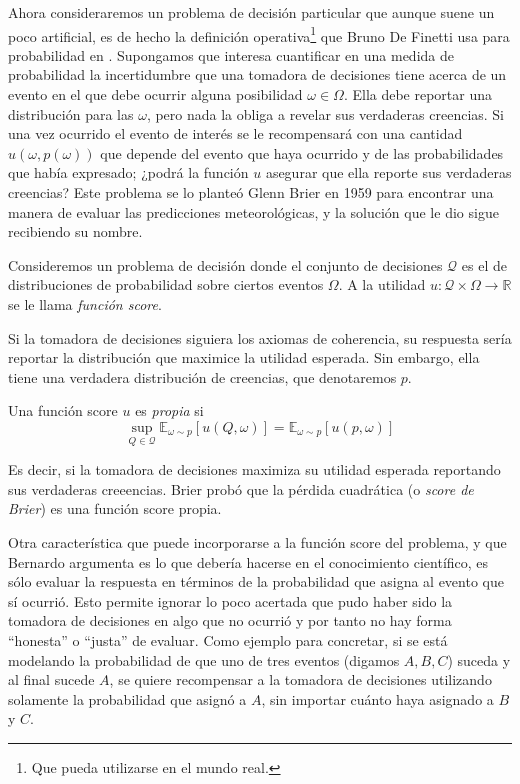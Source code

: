 \documentclass[main.tex]{subfiles}
\begin{document}
Ahora consideraremos un problema de decisión particular que aunque suene un poco
artificial, es de hecho la definición operativa\footnote{Que pueda utilizarse en
el mundo real.} que Bruno De Finetti usa para probabilidad en
\cite{definetti2008}.  Supongamos que interesa cuantificar en una medida de
probabilidad la incertidumbre que una tomadora de decisiones tiene acerca de un
evento en el que debe ocurrir alguna posibilidad  $\omega \in \Omega$. Ella debe
reportar una distribución para las $\omega$, pero nada la obliga a revelar sus
verdaderas creencias. Si una vez ocurrido el evento de interés se le
recompensará con una cantidad $u(\omega,p(\omega))$ que depende del evento que
haya ocurrido y de las probabilidades que había expresado; ¿podrá la función $u$
asegurar que ella reporte sus verdaderas creencias?  Este problema se lo planteó
Glenn Brier en 1959 para encontrar una manera de evaluar las predicciones
meteorológicas, y la solución que le dio sigue recibiendo su nombre. 

\begin{definition}
	Consideremos un problema de decisión donde el conjunto de decisiones
	$\mathcal{Q}$ es el de distribuciones de probabilidad sobre ciertos eventos
	$\Omega$. A la utilidad $u: \mathcal{Q}\times\Omega \to \mathbb{R}$ se le
	llama \textit{función score}.
\end{definition}

Si la tomadora de decisiones siguiera los axiomas de coherencia, su respuesta
sería reportar la distribución que maximice la utilidad esperada. Sin embargo,
ella tiene una verdadera distribución de creencias, que denotaremos $p$. 

\begin{definition}
	Una función score $u$ es \textit{propia} si
	\begin{equation*}
		\sup_{Q \in \mathcal{Q}} 
		\mathbb{E}_{\omega\sim p}\left[u(Q,\omega)\right] = 
		\mathbb{E}_{\omega\sim p}\left[u(p,\omega)\right]
	\end{equation*}
\end{definition}

Es decir, si la tomadora de decisiones maximiza su utilidad esperada reportando
sus verdaderas creeencias. Brier probó que la pérdida cuadrática (o
\textit{score de Brier}) es una función score propia.

Otra característica que puede incorporarse a la función score del problema, y
que Bernardo argumenta es lo que debería hacerse en el conocimiento científico,
es sólo evaluar la respuesta en términos de la probabilidad que asigna al evento
que sí ocurrió. Esto permite ignorar lo poco acertada que pudo haber sido la
tomadora de decisiones en algo que no ocurrió y por tanto no hay forma
\enquote{honesta} o \enquote{justa} de evaluar. Como ejemplo para concretar, si
se está modelando la probabilidad de que uno de tres eventos (digamos $A, B, C$)
suceda y al final sucede $A$, se quiere recompensar a la tomadora de decisiones
utilizando solamente la probabilidad que asignó a $A$, sin importar cuánto haya
asignado a $B$ y $C$. 
\end{document}
